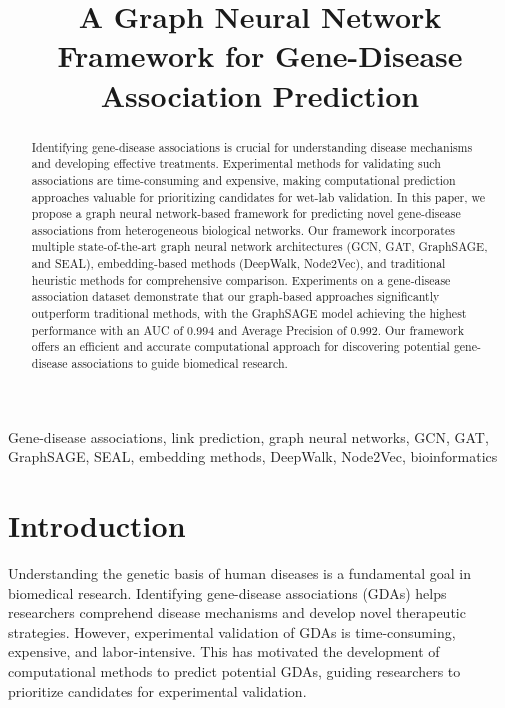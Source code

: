 \documentclass[conference]{IEEEtran}
\begin{document}
\title{A Graph Neural Network Framework for Gene-Disease Association Prediction}

\author{
}

\maketitle

\begin{abstract}
Identifying gene-disease associations is crucial for understanding disease mechanisms and developing effective treatments. Experimental methods for validating such associations are time-consuming and expensive, making computational prediction approaches valuable for prioritizing candidates for wet-lab validation. In this paper, we propose a graph neural network-based framework for predicting novel gene-disease associations from heterogeneous biological networks. Our framework incorporates multiple state-of-the-art graph neural network architectures (GCN, GAT, GraphSAGE, and SEAL), embedding-based methods (DeepWalk, Node2Vec), and traditional heuristic methods for comprehensive comparison. Experiments on a gene-disease association dataset demonstrate that our graph-based approaches significantly outperform traditional methods, with the GraphSAGE model achieving the highest performance with an AUC of 0.994 and Average Precision of 0.992. Our framework offers an efficient and accurate computational approach for discovering potential gene-disease associations to guide biomedical research.
\end{abstract}

\begin{IEEEkeywords}
Gene-disease associations, link prediction, graph neural networks, GCN, GAT, GraphSAGE, SEAL, embedding methods, DeepWalk, Node2Vec, bioinformatics
\end{IEEEkeywords}

\section{Introduction}
Understanding the genetic basis of human diseases is a fundamental goal in biomedical research. Identifying gene-disease associations (GDAs) helps researchers comprehend disease mechanisms and develop novel therapeutic strategies. However, experimental validation of GDAs is time-consuming, expensive, and labor-intensive. This has motivated the development of computational methods to predict potential GDAs, guiding researchers to prioritize candidates for experimental validation.
\end{document}
